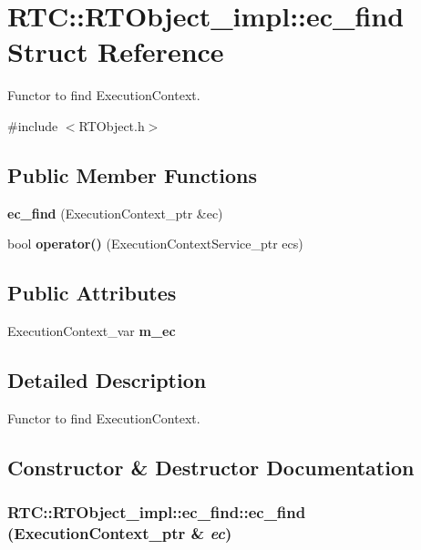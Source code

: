 \section{RTC::RTObject\_\-impl::ec\_\-find Struct Reference}
\label{structRTC_1_1RTObject__impl_1_1ec__find}


Functor to find ExecutionContext.  




{\ttfamily \#include $<$RTObject.h$>$}

\subsection*{Public Member Functions}
\begin{DoxyCompactItemize}
\item 
{\bf ec\_\-find} (ExecutionContext\_\-ptr \&ec)
\item 
bool {\bf operator()} (ExecutionContextService\_\-ptr ecs)
\end{DoxyCompactItemize}
\subsection*{Public Attributes}
\begin{DoxyCompactItemize}
\item 
ExecutionContext\_\-var {\bf m\_\-ec}
\end{DoxyCompactItemize}


\subsection{Detailed Description}
Functor to find ExecutionContext. 

\subsection{Constructor \& Destructor Documentation}
\subsubsection[{ec\_\-find}]{\setlength{\rightskip}{0pt plus 5cm}RTC::RTObject\_\-impl::ec\_\-find::ec\_\-find (ExecutionContext\_\-ptr \& {\em ec})\hspace{0.3cm}{\ttfamily  [inline]}}\label{structRTC_1_1RTObject__impl_1_1ec__find_aa9d1625e73ea0bd77da0d6a7070ff96b}


